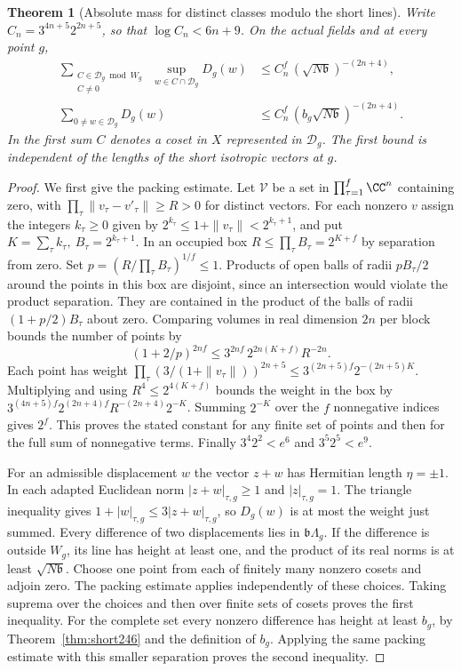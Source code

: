 \documentclass[a4paper,11pt]{article}
\newtheorem{theorem}[proposition]{Theorem}
\theoremstyle{definition}
\theoremstyle{remark}
\numberwithin{equation}{section}
\begin{document}
\begin{theorem}[Absolute mass for distinct classes modulo the short lines]
\leavevmode\label{thm:packing246}
Write \(C_n=3^{4n+5}2^{2n+5}\), so that \(\log C_n<6n+9\).
On the actual fields and at every point \(g\),
\[
 \begin{split}
 \sum_{\substack{C\in\mathcal D_g\bmod W_g\\C\ne0}}
          \ \sup_{w\in C\cap\mathcal D_g} D_g(w)
   &\le C_n^f\,(\sqrt{N\mathfrak b})^{-(2n+4)},\\
 \sum_{0\ne w\in\mathcal D_g}D_g(w)
   &\le C_n^f\,(b_g\sqrt{N\mathfrak b})^{-(2n+4)} .
 \end{split}
\]
In the first sum \(C\) denotes a coset in \(X\) represented in
\(\mathcal D_g\). The first bound is independent of the lengths
of the short isotropic vectors at \(g\).
\end{theorem}
\begin{proof}
We first give the packing estimate. Let \(\mathcal V\) be a set
in \(\prod_{\tau=1}^{f}\CC^n\) containing zero, with
\(\prod_\tau\|v_\tau-v'_\tau\|\ge R>0\) for distinct vectors.
For each nonzero \(v\) assign the integers \(k_\tau\ge0\) given by
\(2^{k_\tau}\le1+\|v_\tau\|<2^{k_\tau+1}\), and put
\(K=\sum_\tau k_\tau,\ B_\tau=2^{k_\tau+1}\). In an occupied
box \(R\le\prod_\tau B_\tau=2^{K+f}\) by separation from zero.
Set \(p=(R/\prod_\tau B_\tau)^{1/f}\le1\).
Products of open balls of radii \(pB_\tau/2\) around the points
in this box are disjoint, since an intersection would violate
the product separation. They are contained in the product of the
balls of radii \((1+p/2)B_\tau\) about zero. Comparing volumes in
real dimension \(2n\) per block bounds the number of points by
\[
       (1+2/p)^{2nf}\le 3^{2nf}\,2^{2n(K+f)}R^{-2n}.
\]
Each point has weight
\(\prod_\tau(3/(1+\|v_\tau\|))^{2n+5}
 \le 3^{(2n+5)f}2^{-(2n+5)K}\).
Multiplying and using \(R^4\le2^{4(K+f)}\) bounds the weight in
the box by
\(3^{(4n+5)f}2^{(2n+4)f}R^{-(2n+4)}2^{-K}\).
Summing \(2^{-K}\) over the \(f\) nonnegative indices gives
\(2^f\). This proves the stated constant for any finite set of
points and then for the full sum of nonnegative terms. Finally
\(3^4 2^2<e^6\) and \(3^5 2^5<e^9\).

For an admissible displacement \(w\) the vector \(z+w\) has
Hermitian length \(\eta=\pm1\). In each adapted Euclidean norm
\(|z+w|_{\tau,g}\ge1\) and \(|z|_{\tau,g}=1\). The triangle
inequality gives \(1+|w|_{\tau,g}\le3|z+w|_{\tau,g}\), so \(D_g(w)\)
is at most the weight just summed. Every difference of two
displacements lies in \(\mathfrak b\Lambda_g\). If the difference
is outside \(W_g\), its line has height at least one, and the product
of its real norms is at least \(\sqrt{N\mathfrak b}\). Choose one
point from each of finitely many nonzero cosets and adjoin zero.
The packing estimate applies independently of these choices.
Taking suprema over the choices and then over finite sets of cosets
proves the first inequality. For the complete set every nonzero
difference has height at least \(b_g\), by Theorem~\ref{thm:short246}
and the definition of \(b_g\). Applying the same packing estimate
with this smaller separation proves the second inequality.
\end{proof}
\end{document}
